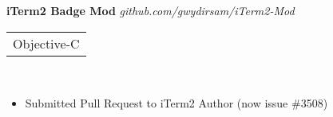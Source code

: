 \documentclass[resmargin,line,12pt]{res}
\begin{document}
{\begin{resume}


{\bf iTerm2 Badge Mod} {\em  github.com/gwydirsam/iTerm2-Mod}  \
\\
\begin{tabular}{l}
  Objective-C
\end{tabular}
\\
\vspace{-.16in}
\begin{itemize}
  \item Submitted Pull Request to iTerm2 Author (now issue \#3508)
\end{itemize}
\vspace{-.10in}


\end{resume}}
\end{document}
